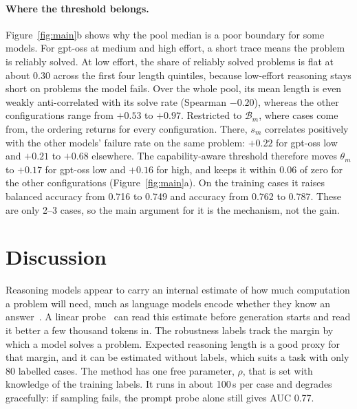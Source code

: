 \documentclass{article}
\begin{document}
\paragraph{Where the threshold belongs.}
\label{sec:where}
Figure~\ref{fig:main}b shows why the pool median is a poor boundary for some models.
For gpt-oss at medium and high effort, a short trace means the problem is reliably solved.
At low effort, the share of reliably solved problems is flat at about 0.30 across the first four length quintiles, because low-effort reasoning stays short on problems the model fails.
Over the whole pool, its mean length is even weakly anti-correlated with its solve rate (Spearman $-0.20$), whereas the other configurations range from $+0.53$ to $+0.97$.
Restricted to $\mathcal{B}_m$, where cases come from, the ordering returns for every configuration.
There, $s_m$ correlates positively with the other models' failure rate on the same problem: $+0.22$ for gpt-oss low and $+0.21$ to $+0.68$ elsewhere.
The capability-aware threshold therefore moves $\theta_m$ to $+0.17$ for gpt-oss low and $+0.16$ for high, and keeps it within $0.06$ of zero for the other configurations (Figure~\ref{fig:main}a).
On the training cases it raises balanced accuracy from 0.716 to 0.749 and accuracy from 0.762 to 0.787. These are only 2--3 cases, so the main argument for it is the mechanism, not the gain.

\section{Discussion}
Reasoning models appear to carry an internal estimate of how much computation a problem will need, much as language models encode whether they know an answer~\citep{kadavath2022know,azaria2023internal}.
A linear probe~\citep{alain2016probes,belinkov2022probing} can read this estimate before generation starts and read it better a few thousand tokens in.
The robustness labels track the margin by which a model solves a problem. Expected reasoning length is a good proxy for that margin, and it can be estimated without labels, which suits a task with only 80 labelled cases.
The method has one free parameter, $\rho$, that is set with knowledge of the training labels.
It runs in about 100\,s per case and degrades gracefully: if sampling fails, the prompt probe alone still gives AUC 0.77.
\end{document}
